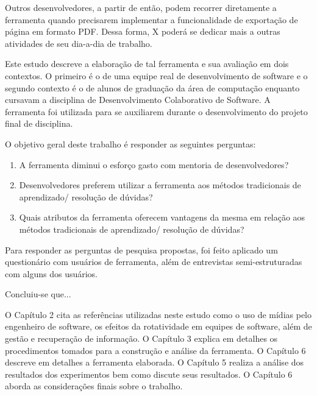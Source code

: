Outros desenvolvedores, a partir de então, podem recorrer diretamente a ferramenta quando precisarem implementar a funcionalidade de exportação de página em formato PDF. Dessa forma, X poderá se dedicar mais a outras atividades de seu dia-a-dia de trabalho.

Este estudo descreve a elaboração de tal ferramenta e sua avaliação em dois contextos. O primeiro é o de uma equipe real de desenvolvimento de software e o segundo contexto é o de alunos de graduação da área de computação enquanto cursavam a disciplina de Desenvolvimento Colaborativo de Software. A ferramenta foi utilizada para se auxiliarem durante o desenvolvimento do projeto final de disciplina.

O objetivo geral deste trabalho é responder as seguintes perguntas:

\begin{enumerate}
  \item A ferramenta diminui o esforço gasto com mentoria de desenvolvedores?
  \item Desenvolvedores preferem utilizar a ferramenta aos métodos tradicionais de aprendizado/ resolução de dúvidas?
  \item Quais atributos da ferramenta oferecem vantagens da mesma em relação aos métodos tradicionais de aprendizado/ resolução de dúvidas?
\end{enumerate}



Para responder as perguntas de pesquisa propostas, foi feito aplicado um questionário com usuários de ferramenta, além de entrevistas semi-estruturadas com alguns dos usuários.

Concluiu-se que...

O Capítulo 2 cita as referências utilizadas neste estudo como o uso de mídias pelo engenheiro de software, os efeitos da rotatividade em equipes de software, além de gestão e recuperação de informação. O Capítulo 3 explica em detalhes os procedimentos tomados para a construção e análise da ferramenta. O Capítulo 6 descreve em detalhes a ferramenta elaborada. O Capítulo 5 realiza a análise dos resultados dos experimentos bem como discute seus resultados. O Capítulo 6 aborda as considerações finais sobre o trabalho.

